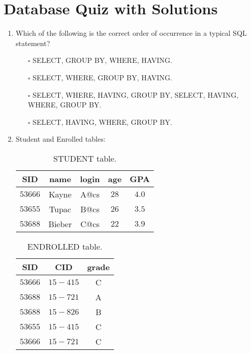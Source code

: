 \documentclass[10pt]{article}
\newcommand{\lightrule}{%
	\arrayrulecolor{black!30}%
	\midrule[\lightrulewidth]%
	\arrayrulecolor{black}}
\begin{document}
	\section{Database Quiz with Solutions}
		\begin{enumerate}
			\item Which of the following is the correct order of occurrence in a typical SQL statement?
				\begin{enumerate}
					\item[$\square$] SELECT, GROUP BY, WHERE, HAVING.
					\item[$\square$] SELECT, WHERE, GROUP BY, HAVING.
					\item[$\square$] SELECT, WHERE, HAVING, GROUP BY, SELECT, HAVING, WHERE, GROUP BY.
					\item[$\square$] SELECT, HAVING, WHERE, GROUP BY.
				\end{enumerate}

			\item Student and Enrolled tables:
				\begin{table}[H]
					\centering
					\begin{tabular}{@{} *{5}{c} @{}}
						\toprule
							\textbf{SID} & \textbf{name} & \textbf{login} & \textbf{age} & \textbf{GPA} \\
						\midrule
							$53666$ & Kayne & A@cs & $28$ & $4.0$ \\ 
						\lightrule
							$53655$ & Tupac & B@cs & $26$ & $3.5$ \\  
						\lightrule
							$53688$ & Bieber & C@cs & $22$ & $3.9$ \\ 
						\bottomrule
					\end{tabular}
					\caption{STUDENT table.}
				\end{table}

				\begin{table}[H]
					\centering
					\begin{tabular}{@{} *{3}{c} @{}}
						\toprule
							\textbf{SID} & \textbf{CID} & \textbf{grade} \\
						\midrule
							$53666$ & $15-415$ & C \\ 
						\lightrule
							$53688$ & $15-721$ & A \\  
						\lightrule
							$53688$ & $15-826$ & B \\
						\lightrule 
							$53655$ & $15-415$ & C \\ 
						\lightrule 
							$53666$ & $15-721$ & C \\ 
						\bottomrule
					\end{tabular}
					\caption{ENDROLLED table.}
				\end{table}
			

\end{enumerate}
\end{document}
